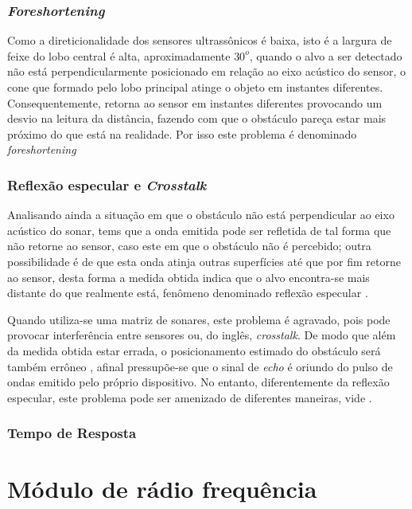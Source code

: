 \subsubsection{\textit{Foreshortening}}
Como a direticionalidade dos sensores ultrassônicos é baixa, isto é a largura de feixe do lobo central é alta, aproximadamente $30^o$, quando o alvo 
a ser detectado não está perpendicularmente posicionado em relação ao eixo acústico do sensor, o cone que formado pelo lobo principal atinge o objeto 
em instantes diferentes. Consequentemente, retorna ao sensor em instantes diferentes provocando um desvio na leitura da distância, fazendo com que o 
obstáculo pareça estar mais próximo do que está na realidade. Por isso este problema é denominado \textit{foreshortening}

\subsubsection{Reflexão especular e \textit{Crosstalk}}
Analisando ainda a situação em que o obstáculo não está perpendicular ao eixo acústico do sonar, tems que a onda emitida pode ser refletida de tal 
forma que não retorne ao sensor, caso este em que o obstáculo não é percebido; outra possibilidade é de que esta onda atinja outras superfícies até 
que por fim retorne ao sensor, desta forma a medida obtida indica que o alvo encontra-se mais distante do que realmente está, fenômeno denominado 
reflexão especular \cite{roseli,siegwart,everett}.  

Quando utiliza-se uma matriz de sonares, este problema é agravado, pois pode provocar interferência entre sensores ou, do inglês, \textit{crosstalk}.
De modo que além da medida obtida estar errada, o posicionamento estimado do obstáculo será também errôneo \cite{murphy}, afinal pressupõe-se que o 
sinal de \textit{echo} é oriundo do pulso de ondas emitido pelo próprio dispositivo.
No entanto, diferentemente da reflexão especular, este problema pode ser amenizado de diferentes maneiras, vide \cite{2016_artigo_1,2016_artigo_5}.

\subsubsection{Tempo de Resposta} %


\section{Módulo de rádio frequência}

